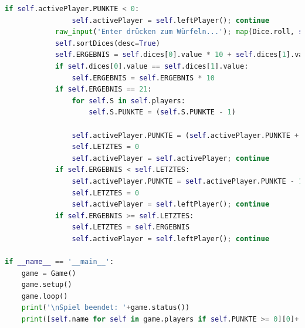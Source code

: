 \begin{lstlisting}[language=Python]
            if self.activePlayer.PUNKTE < 0:
                self.activePlayer = self.leftPlayer(); continue
            raw_input('Enter drücken zum Würfeln...'); map(Dice.roll, self.dices); print('Du hast '+', '.join(map(str, [dice.value for dice in self.dices]))+' gewürfelt!')
            self.sortDices(desc=True)
            self.ERGEBNIS = self.dices[0].value * 10 + self.dices[1].value
            if self.dices[0].value == self.dices[1].value:
                self.ERGEBNIS = self.ERGEBNIS * 10
            if self.ERGEBNIS == 21:
                for self.S in self.players:
                    self.S.PUNKTE = (self.S.PUNKTE - 1)
                
                self.activePlayer.PUNKTE = (self.activePlayer.PUNKTE + 1)
                self.LETZTES = 0
                self.activePlayer = self.activePlayer; continue
            if self.ERGEBNIS < self.LETZTES:
                self.activePlayer.PUNKTE = self.activePlayer.PUNKTE - 1
                self.LETZTES = 0
                self.activePlayer = self.leftPlayer(); continue
            if self.ERGEBNIS >= self.LETZTES:
                self.LETZTES = self.ERGEBNIS
                self.activePlayer = self.leftPlayer(); continue

if __name__ == '__main__':
    game = Game()
    game.setup()
    game.loop()
    print('\nSpiel beendet: '+game.status())
    print([self.name for self in game.players if self.PUNKTE >= 0][0]+' hat gewonnen!')
\end{lstlisting}

